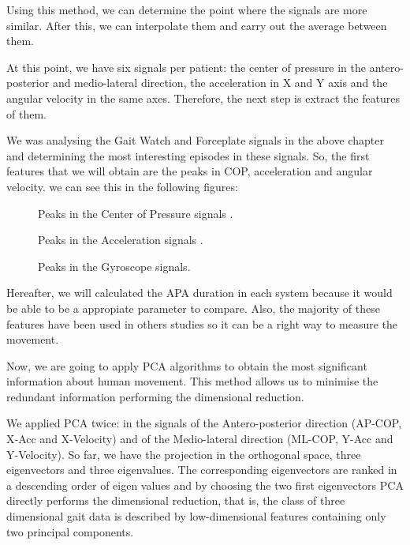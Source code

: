 Using this method, we can determine the point where the signals are more similar. After this, we can interpolate them and carry out the average between them.

At this point, we have six signals per patient: the center of pressure in the antero-posterior and medio-lateral direction, the acceleration in X and Y axis and the angular velocity in the same axes. Therefore, the next step is extract the features of them. 

We was analysing the Gait Watch and Forceplate signals in the above chapter and determining the most interesting episodes in these signals. So, the first features that we will obtain are the peaks in COP, acceleration and angular velocity. we can see this in the following figures:

\begin{figure}[H]
	\centering
	\caption{Peaks in the Center of Pressure signals .}
	\label{fig:COP_features}
\end{figure}

\begin{figure}[H]
	\centering
	\caption{Peaks in the Acceleration signals .}
	\label{fig:Acc_features}
\end{figure}

\begin{figure}[H]
	\centering
	\caption{Peaks in the Gyroscope signals.}
	\label{fig:Gyro_features}
\end{figure}


Hereafter, we will calculated the APA duration in each system because it would be able to be a appropiate parameter to compare. Also, the majority of these features have been used in others studies \cite{Mancini2009} so it can be a right way to measure the movement.

Now, we are going to apply PCA algorithms to obtain the most significant information about human movement. This method allows us to minimise the redundant information performing the dimensional reduction.

We applied PCA twice: in the signals of the Antero-posterior direction (AP-COP, X-Acc and X-Velocity) and of the Medio-lateral direction (ML-COP, Y-Acc and Y-Velocity). So far, we have the projection in the orthogonal space, three eigenvectors and three eigenvalues. The corresponding eigenvectors are ranked in a descending order of eigen values and by choosing the two first eigenvectors PCA directly performs the dimensional reduction, that is, the class of three dimensional gait data is described by low-dimensional features containing only two principal components.

